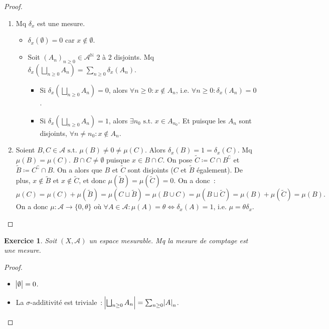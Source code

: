 \documentclass{article}
\newtheorem{ex}{Exercice}[section]
\newcommand{\st}{\text{ s.t. }}
\newcommand{\C}{\complement}
\newcommand{\N}{{\mathbb N}}
\begin{document}
\begin{proof}~
\begin{enumerate}
	\item Mq $\delta_x$ est une mesure.
	\begin{itemize}
		\item $\delta_x(\emptyset) = 0$ car $x \not \in \emptyset$.
		\item Soit $(A_n)_{n \geq 0} \in \mathcal A^\N$ 2 à 2 disjoints. Mq $\delta_x(\bigsqcup_{n \geq 0}A_n) = \sum_{n \geq 0}\delta_x(A_n)$.
		\begin{itemize}
			\item Si $\delta_x(\bigsqcup_{n \geq 0}A_n) = 0$, alors $\forall n \geq 0 : x \not \in A_n$, i.e. $\forall n \geq 0 : \delta_x(A_n) = 0$.
			\item Si $\delta_x(\bigsqcup_{n \geq 0}A_n) = 1$, alors $\exists n_0 \st x \in A_{n_0}$. Et puisque les $A_n$ sont disjoints, $\forall n \neq n_0 : x \not \in A_n$.
		\end{itemize}
	\end{itemize}
	\item Soient $B, C \in \mathcal A \st \mu(B) \neq 0 \neq \mu(C)$. Alors $\delta_x(B) = 1 = \delta_x(C)$. Mq $\mu(B) = \mu(C)$. $B \cap C \neq \emptyset$ puisque $x \in B \cap C$.
	On pose $\tilde C \coloneqq C \cap B^\C$ et $\tilde B \coloneqq C^\C \cap B$. On a alors que $B$ et $\tilde C$ sont disjoints ($C$ et $\tilde B$ également).
	De plus, $x \not \in \tilde B$ et $x \not \in \tilde C$, et donc $\mu(\tilde B) = \mu(\tilde C) = 0$. On a donc~:
	\[\mu(C) = \mu(C) + \mu(\tilde B) = \mu(C \sqcup \tilde B) = \mu(B \cup C) = \mu(B \sqcup \tilde C) = \mu(B) + \mu(\tilde C) = \mu(B).\]
	On a donc $\mu : \mathcal A \to \{0, \theta\}$ où $\forall A \in \mathcal A : \mu(A) = \theta \iff \delta_x(A) = 1$, i.e. $\mu = \theta\delta_x$.
\end{enumerate}
\end{proof}

\begin{ex} Soit $(X, \mathcal A)$ un espace mesurable. Mq la mesure de comptage est une mesure.
\end{ex}

\begin{proof}~
\begin{itemize}
	\item $\abs \emptyset = 0$.
	\item La $\sigma$-additivité est triviale~: $\abs {\bigsqcup_{n \geq 0}A_n} = \sum_{n \geq 0}\abs A_n$.
\end{itemize}
\end{proof}
\end{document}
